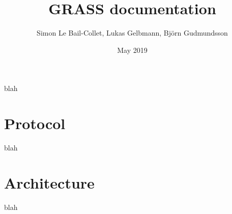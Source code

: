\documentclass{article}
\title{GRASS documentation}
\author{Simon Le Bail-Collet, Lukas Gelbmann, Björn Gudmundsson}
\date{May 2019}
\begin{document}
\maketitle

blah

\section{Protocol}

blah

\section{Architecture}

blah
\end{document}
